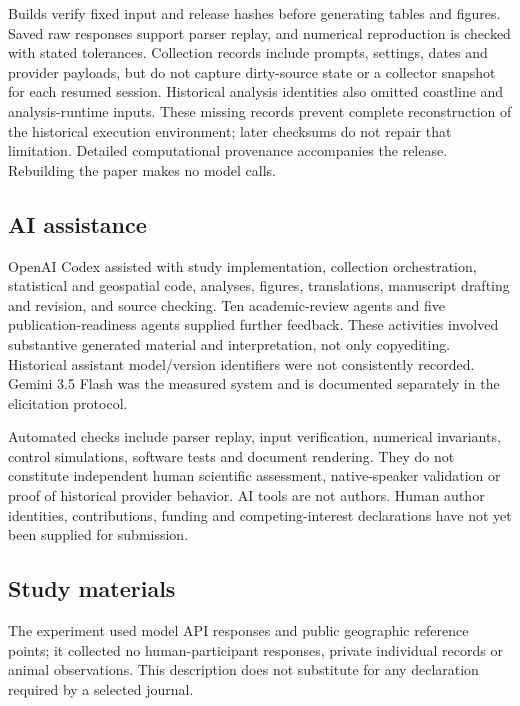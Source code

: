 \documentclass[12pt,a4paper]{article}
\begin{document}
Builds verify fixed input and release hashes before generating tables and figures. Saved raw responses support parser replay, and numerical reproduction is checked with stated tolerances. Collection records include prompts, settings, dates and provider payloads, but do not capture dirty-source state or a collector snapshot for each resumed session. Historical analysis identities also omitted coastline and analysis-runtime inputs. These missing records prevent complete reconstruction of the historical execution environment; later checksums do not repair that limitation. Detailed computational provenance accompanies the release. Rebuilding the paper makes no model calls.

\subsection*{AI assistance}
OpenAI Codex assisted with study implementation, collection orchestration, statistical and geospatial code, analyses, figures, translations, manuscript drafting and revision, and source checking. Ten academic-review agents and five publication-readiness agents supplied further feedback. These activities involved substantive generated material and interpretation, not only copyediting. Historical assistant model/version identifiers were not consistently recorded. Gemini 3.5 Flash was the measured system and is documented separately in the elicitation protocol.

Automated checks include parser replay, input verification, numerical invariants, control simulations, software tests and document rendering. They do not constitute independent human scientific assessment, native-speaker validation or proof of historical provider behavior. AI tools are not authors. Human author identities, contributions, funding and competing-interest declarations have not yet been supplied for submission.

\subsection*{Study materials}
The experiment used model API responses and public geographic reference points; it collected no human-participant responses, private individual records or animal observations. This description does not substitute for any declaration required by a selected journal.
\end{document}
